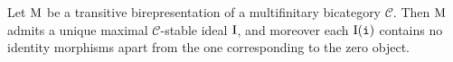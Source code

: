 




\noindent\begin{lemma}\label{UniqueMaximalIdeal} Let $\textup{M}$ be a transitive birepresentation of a multifinitary bicategory $\mathscr{C}$. Then $\textup{M}$ admits a unique maximal $\mathscr{C}$-stable ideal $\textup{I}$, and moreover each $\textup{I}(\textup{\texttt{i}})$ contains no identity morphisms apart from the one corresponding to the zero object.\\
\end{lemma}

